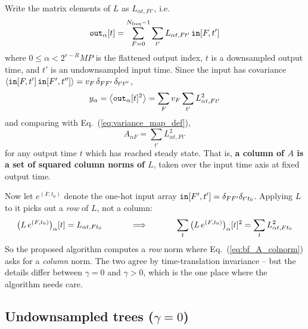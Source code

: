 \documentclass{article}
\numberwithin{equation}{section}   %
\begin{document}
Write the matrix elements of $L$ as $L_{\alpha t, F t'}$, i.e.
\begin{equation}
{\tt out}_\alpha[t] = \sum_{F=0}^{N_{\rm freq}-1} \sum_{t'} L_{\alpha t, F t'} \, {\tt in}[F,t']
\label{eq:bf_L_matrix}
\end{equation}
where $0 \le \alpha < 2^{r-R}MP$ is the flattened output index, $t$ is a downsampled output time,
and $t'$ is an undownsampled input time. Since the input has covariance
$\langle {\tt in}[F,t'] \, {\tt in}[F',t''] \rangle = v_F \, \delta_{FF'} \, \delta_{t't''}$,
\begin{equation}
y_\alpha = \big\langle {\tt out}_\alpha[t]^2 \big\rangle = \sum_F v_F \sum_{t'} L_{\alpha t, F t'}^2
\end{equation}
and comparing with Eq.\ (\ref{eq:variance_map_def}),
\begin{equation}
A_{\alpha F} = \sum_{t'} L_{\alpha t, F t'}^2
\label{eq:bf_A_colnorm}
\end{equation}
for any output time $t$ which has reached steady state. That is, {\bf a column of $A$ is a set of
squared column norms of $L$}, taken over the input time axis at fixed output time.

Now let $e^{(F,t_0)}$ denote the one-hot input array ${\tt in}[F',t'] = \delta_{FF'} \delta_{t't_0}$.
Applying $L$ to it picks out a {\em row} of $L$, not a column:
\begin{equation}
\big( L \, e^{(F,t_0)} \big)_\alpha[t] = L_{\alpha t, F t_0}
\hspace{1.2cm}\Longrightarrow\hspace{1.2cm}
\sum_t \big( L \, e^{(F,t_0)} \big)_\alpha[t]^2 = \sum_t L_{\alpha t, F t_0}^2
\label{eq:bf_rownorm}
\end{equation}
So the proposed algorithm computes a {\em row} norm where Eq.\ (\ref{eq:bf_A_colnorm}) asks for a
{\em column} norm. The two agree by time-translation invariance -- but the details differ between
$\gamma=0$ and $\gamma>0$, which is the one place where the algorithm needs care.

\subsection{Undownsampled trees ($\gamma=0$)}
\end{document}
